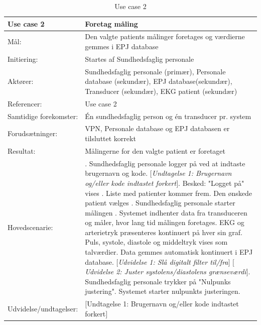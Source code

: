 \begin{table}[H]
\caption{Use case 2}\label{tab:tabel5}
\begin{tabular}{| l | >{\raggedright\arraybackslash}p{11cm} |}
   \hline
   \textbf{Use case 2} & \textbf{Foretag måling}\\ \hline
   Mål: & Den valgte patients målinger foretages og værdierne gemmes i EPJ database\\ \hline
   Initiering: & Startes af Sundhedsfaglig personale\\ \hline
   Aktører:& Sundhedsfaglig personale (primær), Personale database (sekundær), EPJ database(sekundær), Transducer (sekundær), EKG patient (sekundær)\\ \hline
   Referencer: & Use case 2 \\ \hline
   Samtidige forekomster: & Én sundhedsfaglig person og én transducer pr. system \\\hline
   Forudsætninger: & VPN, Personale database og EPJ databasen er tilsluttet korrekt\\ \hline
   Resultat:& Målingerne for den valgte patient er foretaget\\ \hline
   Hovedscenarie:& 
1. Sundhedsfaglig personale logger på ved at indtaste brugernavn og kode. \newline
   \textit{$[$Undtagelse 1: Brugernavn og/eller kode indtastet forkert$]$}\newline
2. Besked: "Logget på" vises  \newline
3. Liste med patienter kommer frem\newline
4. Den ønskede patient vælges \newline
5. Sundhedsfaglig personale starter målingen \newline
6. Systemet indhenter data fra transduceren og måler, hvor lang tid målingen foretages\newline
7. EKG og arterietryk præsenteres kontinuert på hver sin graf. Puls, systole, diastole og middeltryk vises som talværdier. Data gemmes automatisk kontinuert i EPJ database. \newline
\textit{$[$Udvidelse 1: Slå digitalt filter til/fra$]$}\newline
\textit{$[$Udvidelse 2: Juster systolens/diastolens grænseværdi$]$}\newline
8. Sundhedsfaglig personale trykker på "Nulpunks justering"\newline
9. Systemet starter nulpunkts justeringen. \\\hline
Udvidelse/undtagelser: & $[$Undtagelse 1: Brugernavn og/eller kode indtastet forkert$]$\newline

\end{tabular}
\end{table}
